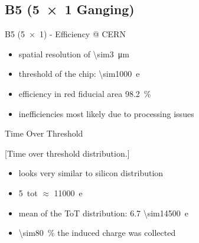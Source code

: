 \subsection{B5 (\SI{5x1}{} Ganging)}
\begin{frame}{B5 (\SI{5x1}{}) - Efficiency @ CERN}

	
	\begin{itemize}\itemfill
		\item spatial resolution of \SI{\sim3}{\micro\meter}
		\item threshold of the chip: \SI{\sim1000}{e}
		\item efficiency in red fiducial area \SI{98.2}{\%}
		\item inefficiencies most likely due to processing issues
	\end{itemize}
	
\end{frame}
\begin{frame}{Time Over Threshold}

	[Time over threshold distribution.]	
	
	\begin{itemize}\itemfill
		\item looks very similar to silicon distribution
		\item \SI{5}{tot} $\approx$ \SI{11000}{e}
		\item mean of the ToT distribution: 6.7 \ra \SI{\sim14500}{e}
		\item \SI{\sim80}{\%} the induced charge was collected
	\end{itemize}
	
\end{frame}
